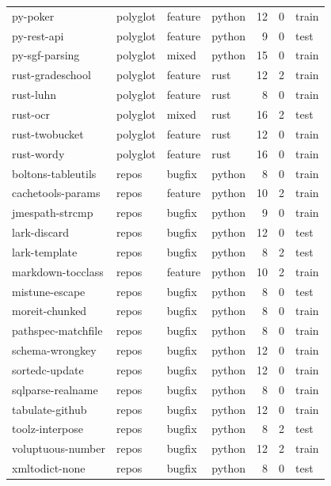 \begin{xltabular}{\textwidth}{@{}l l l l r r l@{}}
py-poker & polyglot & feature & python & 12 & 0 & train \\
py-rest-api & polyglot & feature & python & 9 & 0 & test \\
py-sgf-parsing & polyglot & mixed & python & 15 & 0 & train \\
rust-gradeschool & polyglot & feature & rust & 12 & 2 & train \\
rust-luhn & polyglot & feature & rust & 8 & 0 & train \\
rust-ocr & polyglot & mixed & rust & 16 & 2 & test \\
rust-twobucket & polyglot & feature & rust & 12 & 0 & train \\
rust-wordy & polyglot & feature & rust & 16 & 0 & train \\
boltons-tableutils & repos & bugfix & python & 8 & 0 & train \\
cachetools-params & repos & feature & python & 10 & 2 & train \\
jmespath-strcmp & repos & bugfix & python & 9 & 0 & train \\
lark-discard & repos & bugfix & python & 12 & 0 & test \\
lark-template & repos & bugfix & python & 8 & 2 & test \\
markdown-tocclass & repos & feature & python & 10 & 2 & train \\
mistune-escape & repos & bugfix & python & 8 & 0 & test \\
moreit-chunked & repos & bugfix & python & 8 & 0 & train \\
pathspec-matchfile & repos & bugfix & python & 8 & 0 & train \\
schema-wrongkey & repos & bugfix & python & 12 & 0 & train \\
sortedc-update & repos & bugfix & python & 12 & 0 & train \\
sqlparse-realname & repos & bugfix & python & 8 & 0 & train \\
tabulate-github & repos & bugfix & python & 12 & 0 & train \\
toolz-interpose & repos & bugfix & python & 8 & 2 & test \\
voluptuous-number & repos & bugfix & python & 12 & 2 & train \\
xmltodict-none & repos & bugfix & python & 8 & 0 & test \\
\end{xltabular}
